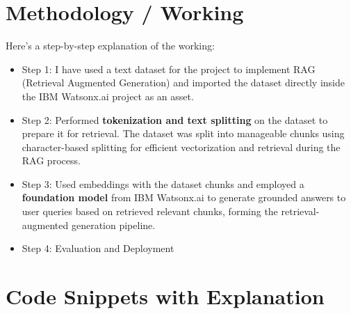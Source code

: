 \documentclass[12pt]{article}
\begin{document}
\section{Methodology / Working}
Here’s a step-by-step explanation of the working:

\begin{itemize}
  \item Step 1: I have used a text dataset for the project to implement RAG (Retrieval Augmented Generation) and imported the dataset directly inside the IBM Watsonx.ai project as an asset.
  
  \item Step 2: Performed \textbf{tokenization and text splitting} on the dataset to prepare it for retrieval. The dataset was split into manageable chunks using character-based splitting for efficient vectorization and retrieval during the RAG process.
  
  \item Step 3: Used embeddings with the dataset chunks and employed a \textbf{foundation model} from IBM Watsonx.ai to generate grounded answers to user queries based on retrieved relevant chunks, forming the retrieval-augmented generation pipeline.
  
  \item Step 4: Evaluation and Deployment
\end{itemize}


\vspace{1cm}
\begin{center}
\end{center}

\newpage

\section{Code Snippets with Explanation}
\end{document}
